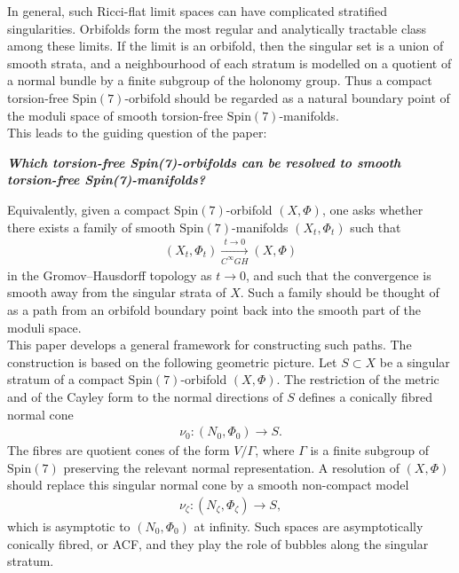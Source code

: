 \documentclass[psamsfonts]{amsart}
\theoremstyle{plain}
\theoremstyle{definition}{
\newtheorem{defi}{Definition}[section]
\newtheorem{ass}{Assumption}
\newtheorem*{nota}{Notation}}
\theoremstyle{remark}{
\newtheorem{rem}{Remark}
\newtheorem{ex}{Example}}
\theoremstyle{plain}{
\newtheorem{thm}{Theorem}[section]
\newtheorem{lem}{Lemma}[section]
\newtheorem{cor}{Corollary}[section]
\newtheorem{prop}{Proposition}[section]
\newtheorem{con}{Conjecture}[section]}
\newcommand{\m}[1]{{\mathrm{#1}}}
\begin{document}
In general, such Ricci-flat limit spaces can have complicated stratified singularities. Orbifolds form the most regular and analytically tractable class among these limits. If the limit is an orbifold, then the singular set is a union of smooth strata, and a neighbourhood of each stratum is modelled on a quotient of a normal bundle by a finite subgroup of the holonomy group. Thus a compact torsion-free $\m{Spin}(7)$-orbifold should be regarded as a natural boundary point of the moduli space of smooth torsion-free $\m{Spin}(7)$-manifolds.\\

This leads to the guiding question of the paper:
\vspace{0.3cm}
\begin{center}
    \textit{\textbf{Which torsion-free Spin(7)-orbifolds can be resolved to smooth torsion-free Spin(7)-manifolds?}}
\end{center}
\vspace{0.3cm}
Equivalently, given a compact $\m{Spin}(7)$-orbifold $(X,\Phi)$, one asks whether there exists a family of smooth $\m{Spin}(7)$-manifolds $(X_t,\Phi_t)$ such that
\begin{align*}
    (X_t,\Phi_t) \xrightarrow[C^\infty GH]{t\to 0} (X,\Phi)
\end{align*}
in the Gromov--Hausdorff topology as $t \to 0$, and such that the convergence is smooth away from the singular strata of $X$. Such a family should be thought of as a path from an orbifold boundary point back into the smooth part of the moduli space.\\

This paper develops a general framework for constructing such paths. The construction is based on the following geometric picture. Let $S \subset X$ be a singular stratum of a compact $\m{Spin}(7)$-orbifold $(X,\Phi)$. The restriction of the metric and of the Cayley form to the normal directions of $S$ defines a conically fibred normal cone
\begin{align*}
    \nu_0 \colon (N_0,\Phi_0) \longrightarrow S.
\end{align*}
The fibres are quotient cones of the form $V/\Gamma$, where $\Gamma$ is a finite subgroup of $\m{Spin}(7)$ preserving the relevant normal representation. A resolution of $(X,\Phi)$ should replace this singular normal cone by a smooth non-compact model
\begin{align*}
    \nu_\zeta \colon  (N_\zeta,\Phi_\zeta) \longrightarrow S,
\end{align*}
which is asymptotic to $(N_0,\Phi_0)$ at infinity. Such spaces are asymptotically conically fibred, or ACF, and they play the role of bubbles along the singular stratum.\\
\end{document}
